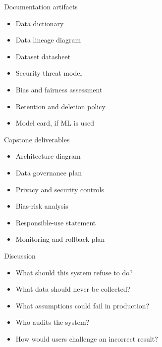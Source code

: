 \documentclass[aspectratio=43,12pt]{beamer}
\begin{document}
\begin{frame}{Documentation artifacts}
\begin{itemize}
  \item Data dictionary
  \item Data lineage diagram
  \item Dataset datasheet
  \item Security threat model
  \item Bias and fairness assessment
  \item Retention and deletion policy
  \item Model card, if ML is used
\end{itemize}
\end{frame}

\begin{frame}{Capstone deliverables}
\begin{itemize}
  \item Architecture diagram
  \item Data governance plan
  \item Privacy and security controls
  \item Bias-risk analysis
  \item Responsible-use statement
  \item Monitoring and rollback plan
\end{itemize}
\end{frame}

\begin{frame}{Discussion}
\begin{itemize}
  \item What should this system refuse to do?
  \item What data should never be collected?
  \item What assumptions could fail in production?
  \item Who audits the system?
  \item How would users challenge an incorrect result?
\end{itemize}
\end{frame}
\end{document}
